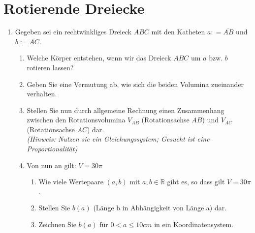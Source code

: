 \documentclass{scrartcl}
\begin{document}
	\section{Rotierende Dreiecke}
		
	\begin{enumerate}
		\item Gegeben sei ein rechtwinkliges Dreieck $ABC$ mit den Katheten $a: = \overline{AB}$ und $b := \overline{AC}$. 
			\begin{enumerate}
				\item Welche Körper entstehen, wenn wir das Dreieck $ABC$ um $a$ bzw. $b$ rotieren lassen? 
				\item Geben Sie eine Vermutung ab, wie sich die beiden Volumina zueinander verhalten.
				\item Stellen Sie nun durch allgemeine Rechnung einen Zusammenhang zwischen den Rotationsvolumina $V_{AB}$ (Rotationsachse $AB$) und $V_{AC}$ (Rotationsachse $AC$) dar. \\ \emph{(Hinweis: Nutzen sie ein Gleichungssystem; Gesucht ist eine Proportionalität)}
				\item Von nun an gilt: $V=30 \pi$
					\begin{enumerate}
						\item Wie viele Wertepaare $(a,b)$ mit $a,b \in \mathbb{R}$ gibt es, so dass gilt $V=30 \pi$.
						\item Stellen Sie $b(a)$ (Länge b in Abhängigkeit von Länge a) dar.
						\item Zeichnen Sie $b(a)$ für $0 < a  \leq 10cm $ in ein Koordinatensystem.
					\end{enumerate} 	
				
			\end{enumerate}
				
	\end{enumerate} 
	
		
\end{document}
